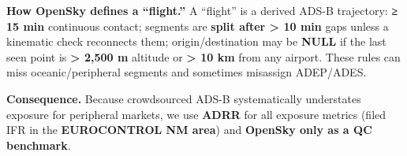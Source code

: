 \documentclass[
  authoryear,
  preprint,
  3p,
  onecolumn]{elsarticle}
\begin{document}
\textbf{How OpenSky defines a ``flight.''} A ``flight'' is a derived
ADS-B trajectory: \textbf{≥ 15 min} continuous contact; segments are
\textbf{split after \textgreater{} 10 min} gaps unless a kinematic check
reconnects them; origin/destination may be \textbf{NULL} if the last
seen point is \textbf{\textgreater{} 2,500 m} altitude or
\textbf{\textgreater{} 10 km} from any airport. These rules can miss
oceanic/peripheral segments and sometimes misassign ADEP/ADES.
\citep{strohmeier2021}

\textbf{Consequence.} Because crowdsourced ADS-B systematically
understates exposure for peripheral markets, we use \textbf{ADRR} for
all exposure metrics (filed IFR in the \textbf{EUROCONTROL NM area}) and
\textbf{OpenSky only as a QC benchmark}. \citep{strohmeier2021}

\clearpage
\end{document}
